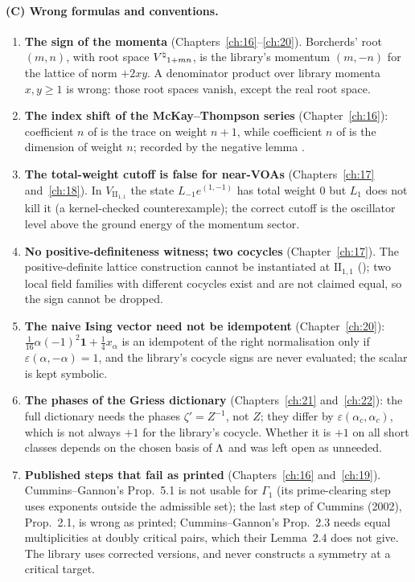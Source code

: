 \paragraph{(C) Wrong formulas and conventions.}
\begin{enumerate}
\item \textbf{The sign of the momenta} (Chapters~\ref{ch:16}--\ref{ch:20}). Borcherds' root $(m,n)$, with root space
  ${V^{\natural}}_{1+mn}$, is the library's momentum $(m,-n)$ for the lattice of norm $+2xy$. A denominator product over library
  momenta $x,y\ge1$ is wrong: those root spaces vanish, except the real root space.
\item \textbf{The index shift of the McKay--Thompson series} (Chapter~\ref{ch:16}): coefficient $n$ of
   is the trace on weight $n+1$, while coefficient $n$ of  is the dimension of weight
  $n$; recorded by the negative lemma .
\item \textbf{The total-weight cutoff is false for near-VOAs} (Chapters~\ref{ch:17} and~\ref{ch:18}). In
  $V_{\mathrm{II}_{1,1}}$ the state $L_{-1}e^{(1,-1)}$ has total weight $0$ but $L_1$ does not kill it (a kernel-checked
  counterexample); the correct cutoff is the oscillator level above the ground energy of the momentum sector.
\item \textbf{No positive-definiteness witness; two cocycles} (Chapter~\ref{ch:17}). The positive-definite lattice
  construction cannot be instantiated at $\mathrm{II}_{1,1}$ (); two local field families with
  different cocycles exist and are not claimed equal, so the sign  cannot be dropped.
\item \textbf{The naive Ising vector need not be idempotent} (Chapter~\ref{ch:20}): $\tfrac1{16}\alpha(-1)^2\mathbf
  1+\tfrac14x_\alpha$ is an idempotent of the right normalisation only if $\varepsilon(\alpha,-\alpha)=1$, and the
  library's cocycle signs are never evaluated; the scalar is kept symbolic.
\item \textbf{The phases of the Griess dictionary} (Chapters~\ref{ch:21} and~\ref{ch:22}): the full dictionary needs the
  phases $\zeta'=Z^{-1}$, not $Z$; they differ by $\varepsilon(\alpha_c,\alpha_c)$, which is not always $+1$ for the
  library's cocycle. Whether it is $+1$ on all short classes depends on the chosen basis of ${\Lambda}$ and was left open as
  unneeded.
\item \textbf{Published steps that fail as printed} (Chapters~\ref{ch:16} and~\ref{ch:19}). Cummins--Gannon's Prop.~5.1 is
  not usable for $\Gamma_1$ (its prime-clearing step uses exponents outside the admissible set); the last step of Cummins
  (2002), Prop.~2.1, is wrong as printed; Cummins--Gannon's Prop.~2.3 needs equal multiplicities at doubly critical pairs,
  which their Lemma~2.4 does not give. The library uses corrected versions, and never constructs a symmetry at a critical
  target.
\end{enumerate}

